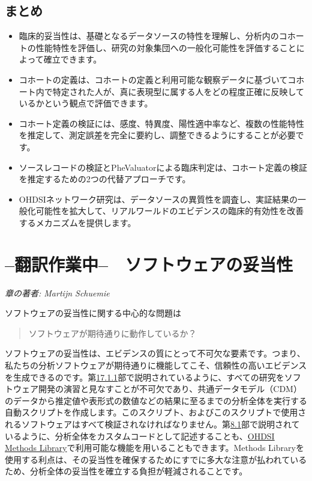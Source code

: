 \documentclass[
  11pt]{book}
\makeatletter
\providecommand{\tightlist}{%
  \setlength{\itemsep}{0pt}\setlength{\parskip}{0pt}}
\newenvironment{kframe}{%
\medskip{}
\setlength{\fboxsep}{.8em}
 \def\at@end@of@kframe{}%
 \ifinner\ifhmode%
  \def\at@end@of@kframe{\end{minipage}}%
  \begin{minipage}{\columnwidth}%
 \fi\fi%
 \def\FrameCommand##1{\hskip\@totalleftmargin \hskip-\fboxsep
 \colorbox{myShadeColor}{##1}\hskip-\fboxsep
     \hskip-\linewidth \hskip-\@totalleftmargin \hskip\columnwidth}%
 \MakeFramed {\advance\hsize-\width
   \@totalleftmargin\z@ \linewidth\hsize
   \@setminipage}}%
 {\par\unskip\endMakeFramed%
 \at@end@of@kframe}
\newenvironment{rmdblock}[1]
  {
  \begin{itemize}
  \renewcommand{\labelitemi}{
    \raisebox{-.7\height}[0pt][0pt]{
      {\setkeys{Gin}{width=3em,keepaspectratio}\texttt{[image: images/\#1]}}
    }
  }
  \setlength{\fboxsep}{1em}
  \begin{kframe}
  \item
  }
  {
  \end{kframe}
  \end{itemize}
  }
\newenvironment{rmdsummary}
  {\begin{rmdblock}{summary}}
  {\end{rmdblock}}
\theoremstyle{definition}
\theoremstyle{definition}
\theoremstyle{definition}
\theoremstyle{definition}
\theoremstyle{remark}
\makeatother
\begin{document}
\section{まとめ}\label{ux307eux3068ux3081-12}

\begin{rmdsummary}
\begin{itemize}
\tightlist
\item
  臨床的妥当性は、基礎となるデータソースの特性を理解し、分析内のコホートの性能特性を評価し、研究の対象集団への一般化可能性を評価することによって確立できます。
\item
  コホートの定義は、コホートの定義と利用可能な観察データに基づいてコホート内で特定された人が、真に表現型に属する人をどの程度正確に反映しているかという観点で評価できます。
\item
  コホート定義の検証には、感度、特異度、陽性適中率など、複数の性能特性を推定して、測定誤差を完全に要約し、調整できるようにすることが必要です。
\item
  ソースレコードの検証とPheValuatorによる臨床判定は、コホート定義の検証を推定するための2つの代替アプローチです。
\item
  OHDSIネットワーク研究は、データソースの異質性を調査し、実証結果の一般化可能性を拡大して、リアルワールドのエビデンスの臨床的有効性を改善するメカニズムを提供します。
\end{itemize}
\end{rmdsummary}

\chapter{--翻訳作業中--　ソフトウェアの妥当性}\label{SoftwareValidity}

\emph{章の著者: Martijn Schuemie}

ソフトウェアの妥当性に関する中心的な問題は

\begin{quote}
ソフトウェアが期待通りに動作しているか？
\end{quote}

ソフトウェアの妥当性は、エビデンスの質にとって不可欠な要素です。つまり、私たちの分析ソフトウェアが期待通りに機能してこそ、信頼性の高いエビデンスを生成できるのです。第\href{https://ohdsi.github.io/TheBookOfOhdsi/SoftwareValidity.html\#automation}{17.1.1}部で説明されているように、すべての研究をソフトウェア開発の演習と見なすことが不可欠であり、共通データモデル（CDM）のデータから推定値や表形式の数値などの結果に至るまでの分析全体を実行する自動スクリプトを作成します。このスクリプト、およびこのスクリプトで使用されるソフトウェアはすべて検証されなければなりません。第\href{https://ohdsi.github.io/TheBookOfOhdsi/OhdsiAnalyticsTools.html\#analysisImplementation}{8.1}部で説明されているように、分析全体をカスタムコードとして記述することも、\href{https://ohdsi.github.io/MethodsLibrary/}{OHDSI Methods Library}で利用可能な機能を用いることもできます。Methods Libraryを使用する利点は、その妥当性を確保するためにすでに多大な注意が払われているため、分析全体の妥当性を確立する負担が軽減されることです。
\end{document}
